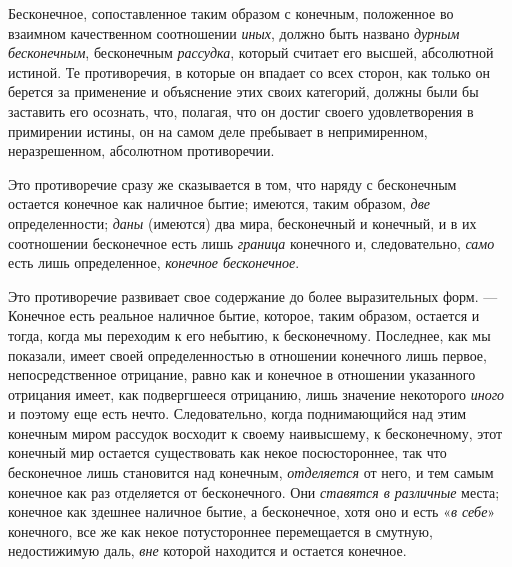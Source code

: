 Бесконечное, сопоставленное таким образом с конечным, положенное во взаимном
качественном соотношении {\em иных}, должно быть
названо {\em дурным бесконечным}, бесконечным
{\em рассудка}, который считает его высшей, абсолютной
истиной. Те противоречия, в которые он впадает со всех сторон, как только
он берется за применение и объяснение этих своих категорий, должны были бы
заставить его осознать, что, полагая, что он достиг своего удовлетворения в
примирении истины, он на самом деле пребывает в непримиренном,
неразрешенном, абсолютном противоречии.

Это противоречие сразу же сказывается в том, что наряду с бесконечным
остается конечное как наличное бытие; имеются, таким образом,
{\em две} определенности;
{\em даны} (имеются) два мира, бесконечный и конечный,
и в их соотношении бесконечное есть лишь {\em граница}
конечного и, следовательно, {\em само} есть лишь
определенное, {\em конечное бесконечное}.

Это противоречие развивает свое содержание до более выразительных форм. —
Конечное есть реальное наличное бытие, которое, таким образом, остается и
тогда, когда мы переходим к его небытию, к бесконечному. Последнее, как мы
показали, имеет своей определенностью в отношении конечного лишь первое,
непосредственное отрицание, равно как и конечное в отношении указанного
отрицания имеет, как подвергшееся отрицанию, лишь значение некоторого
{\em иного} и поэтому еще есть нечто. Следовательно,
когда поднимающийся над этим конечным миром рассудок восходит к своему
наивысшему, к бесконечному, этот конечный мир остается существовать как
некое посюстороннее, так что бесконечное лишь становится над конечным,
{\em отделяется} от него, и тем самым конечное как раз
отделяется от бесконечного. Они {\em ставятся в
различные} места; конечное как здешнее наличное бытие, а бесконечное, хотя
оно и есть «{\em в себе}» конечного, все же как некое
потустороннее перемещается в смутную, недостижимую даль,
{\em вне} которой находится и остается конечное.

